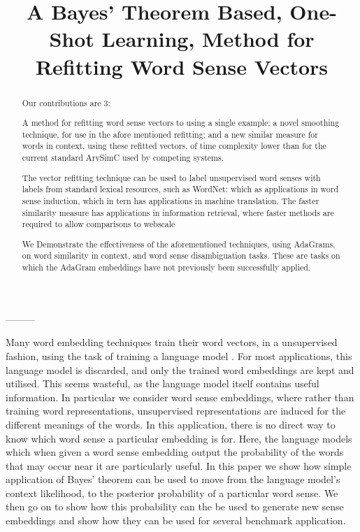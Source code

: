 \documentclass{sig-alternate}
\begin{document}
\title{A Bayes' Theorem Based, One-Shot Learning, Method for Refitting Word Sense Vectors}
\maketitle

\begin{abstract}

Our contributions are 3:

A method for refitting word sense vectors to using a single example;
a novel smoothing technique, for use in the afore mentioned refitting;
and a new similar measure for words in context, using these refitted vectors, of time complexity lower than for the current standard ArvSimC used by competing systems.

The vector refitting technique can be used to label unsupervised word senses with labels from standard lexical resources, such as WordNet: which as applications in word sense induction, which in tern has applications in machine translation.
The faster similarity measure has applications in information retrieval, where faster methods are required to allow comparisons to webscale 



We Demonstrate the effectiveness of the aforementioned techniques, using AdaGrams\cite{AdaGrams}, on word similarity in context, and word sense disambiguation tasks. These are tasks on which the AdaGram embeddings have not previously been successfully applied.

\end{abstract}





---------

Many word embedding techniques train their word vectors, in a unsupervised fashion, using the task of training a language model \parencite{NPLM, collobert2008unified, mikolov2013efficient}.
For most applications, this language model is discarded, and only the trained word embeddings are kept and utilised.
This seems wasteful, as the language model itself contains useful information. In particular we consider word sense embeddings, where rather than training word representations, unsupervised representations are induced for the different meanings of the words.
In this application, there is no direct way to know which word sense a particular embedding is for.
Here, the language models which when given a word sense embedding output the probability of the words that may occur near it are particularly useful. In this paper we show how simple application of Bayes' theorem can be used to move from the language model's context likelihood, to the posterior probability of a particular word sense. We then go on to show how this probability can the be used to generate new sense embeddings and show how they can be used for several benchmark application.
\end{document}

